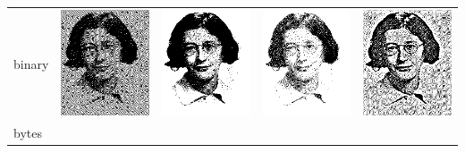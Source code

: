 \begin{tabular}{l|cccc}
	binary &
	\href{z-psimone-errdif.png}{\includegraphics{psimone-errdif.png}}  &
	\href{z-psimone-gamdit.png}{\includegraphics{psimone-gamdit.png}}  &
	\href{z-psimone-ugamdit.png}{\includegraphics{psimone-ugamdit.png}} &
	\href{z-psimone-retdit.png}{\includegraphics{psimone-retdit.png}}  \\
	bytes &
	 &
	 &
	 &
	 \\
\end{tabular}
